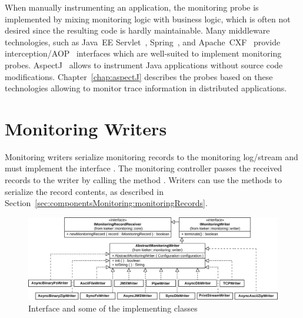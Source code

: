 \enlargethispage{1cm}



\noindent When manually instrumenting an application, the monitoring probe is implemented %
by mixing monitoring logic with business logic, which is often not desired since %
the resulting code is hardly maintainable. %
Many middleware technologies, such as Java~EE Servlet~\cite{JavaServletTechnology-WebSite}, %
Spring~\cite{Spring-WebSite}, and %
Apache~CXF~\cite{CXF-WebSite} provide interception/AOP~\cite{Kiczales1997} interfaces %
which are well-suited to implement monitoring probes. AspectJ~\cite{AspectJ-WebSite} allows to %
instrument Java applications without source code modifications. %
Chapter~\ref{chap:aspectJ} describes the \Kieker{} probes based on these technologies allowing to %
monitor trace information in distributed applications.

\section{Monitoring Writers}\label{sec:monitoring-log-writers}

Monitoring writers serialize monitoring records to the monitoring log/stream and  %
must implement the interface . The monitoring %
controller passes the received records to the writer by calling the method %
. Writers can use the methods to serialize the %
record contents, as described in Section~\ref{sec:componentsMonitoring:monitoringRecords}.

\begin{figure}[b]%
	\begin{centering}
		\includegraphics[scale=0.7]{images/kieker_writerimplsuserguide-modified}
		\caption{Interface  and some of the implementing classes}
		\label{figure:monitoringLogWritersHierarchy}
	\end{centering}
\end{figure}


